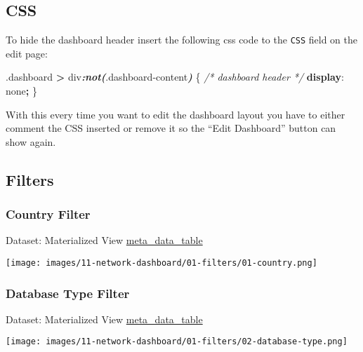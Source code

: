 \documentclass[
]{book}
\newenvironment{Shaded}{\begin{snugshade}}{\end{snugshade}}
\newcommand{\CommentTok}[1]{\textcolor[rgb]{0.56,0.35,0.01}{\textit{#1}}}
\newcommand{\DecValTok}[1]{\textcolor[rgb]{0.00,0.00,0.81}{#1}}
\newcommand{\FunctionTok}[1]{\textcolor[rgb]{0.00,0.00,0.00}{#1}}
\newcommand{\InformationTok}[1]{\textcolor[rgb]{0.56,0.35,0.01}{\textbf{\textit{#1}}}}
\newcommand{\KeywordTok}[1]{\textcolor[rgb]{0.13,0.29,0.53}{\textbf{#1}}}
\newcommand{\NormalTok}[1]{#1}
\newcommand{\OperatorTok}[1]{\textcolor[rgb]{0.81,0.36,0.00}{\textbf{#1}}}
\begin{document}
\hypertarget{css}{%
\subsection*{CSS}\label{css}}

To hide the dashboard header insert the following css code to the \texttt{CSS} field on the edit page:

\begin{Shaded}
\begin{Highlighting}[]
\FunctionTok{.dashboard} \OperatorTok{\textgreater{}}\NormalTok{ div}\InformationTok{:not(}\FunctionTok{.dashboard{-}content}\InformationTok{)}\NormalTok{ \{  }\CommentTok{/* dashboard header */}
  \KeywordTok{display}\NormalTok{: }\DecValTok{none}\OperatorTok{;}
\NormalTok{\}}
\end{Highlighting}
\end{Shaded}

With this every time you want to edit the dashboard layout you have to either comment the CSS inserted
or remove it so the ``Edit Dashboard'' button can show again.

\hypertarget{filters}{%
\subsection*{Filters}\label{filters}}

\hypertarget{country-filter}{%
\subsubsection*{Country Filter}\label{country-filter}}

Dataset: Materialized View \href{materialized-views-1.html\#meta_data_table}{meta\_data\_table}

\texttt{[image: images/11-network-dashboard/01-filters/01-country.png]}

\hypertarget{database-type-filter}{%
\subsubsection*{Database Type Filter}\label{database-type-filter}}

Dataset: Materialized View \href{materialized-views-1.html\#meta_data_table}{meta\_data\_table}

\texttt{[image: images/11-network-dashboard/01-filters/02-database-type.png]}
\end{document}
